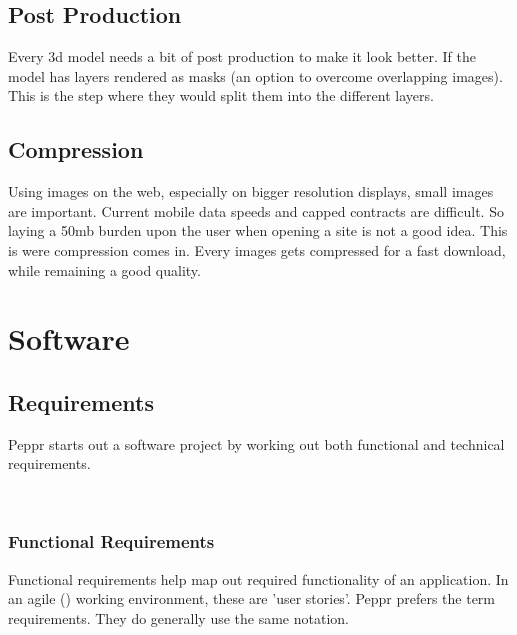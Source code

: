 \subsection{Post Production}
Every 3d model needs a bit of post production to make it look better. If the model has layers rendered as masks (an option to overcome overlapping images). This is the step where they would split them into the different layers.
\subsection{Compression}
Using images on the web, especially on bigger resolution displays, small images are important. Current mobile data speeds and capped contracts are difficult. So laying a 50mb burden upon the user when opening a site is not a good idea. This is were compression comes in. Every images gets compressed for a fast download, while remaining a good quality.
\section{Software}

\subsection{Requirements}
Peppr starts out a software project by working out both functional and technical requirements.

​
\subsubsection{Functional Requirements}
Functional requirements help map out required functionality of an application. In an agile (\cite{Agile: User Stories}) working environment, these are 'user stories'. Peppr prefers the term requirements. They do generally use the same notation. \newline

